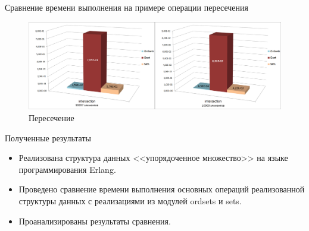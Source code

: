 \documentclass{beamer}
\begin{document}
	\begin{frame}{Сравнение времени выполнения на примере операции пересечения}
		\begin{figure}
			\includegraphics[scale=0.18]{img/histograms/intersection.png}
			\caption{Пересечение}
		\end{figure}		
	\end{frame}
	
	\begin{frame}{Полученные результаты}
		\begin{itemize}
			\item Реализована структура данных <<упорядоченное множество>> на языке программирования Erlang.
			\item Проведено сравнение времени выполнения основных операций реализованной структуры данных с 
			      реализациями из модулей ordsets и sets. 
			\item Проанализированы результаты сравнения.
		\end{itemize}
	\end{frame}
\end{document}
